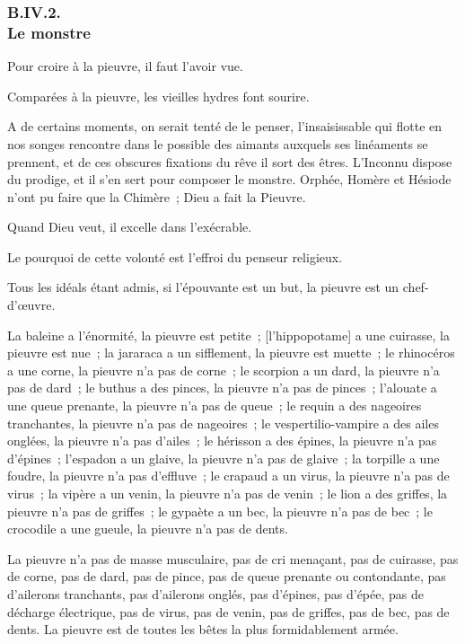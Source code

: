 \documentclass[french,twoside]{book} %
\newcommand\corr[1]{#1}
\begin{document}
 \subsubsection[{B.IV.2. Le monstre}]{B.IV.2. \\
Le monstre}
\noindent Pour croire à la pieuvre, il faut l’avoir vue.\par
Comparées à la pieuvre, les vieilles hydres font sourire.\par
A de certains moments, on serait tenté de le penser, l’insaisissable qui flotte en nos songes rencontre dans le possible des aimants auxquels ses linéaments se prennent, et de ces obscures fixations du rêve il sort des êtres. L’Inconnu dispose du prodige, et il s’en sert pour composer le monstre. Orphée, Homère et Hésiode n’ont pu faire que la Chimère ; Dieu a fait la Pieuvre.\par
Quand Dieu veut, il excelle dans l’exécrable.\par
Le pourquoi de cette volonté est l’effroi du penseur religieux.\par
Tous les idéals étant admis, si l’épouvante est un but, la pieuvre est un chef-d’œuvre.\par
La baleine a l’énormité, la pieuvre est petite ; [{\corr l’hippopotame}] a une cuirasse, la pieuvre est nue ; la jararaca  a un sifflement, la pieuvre est muette ; le rhinocéros a une corne, la pieuvre n’a pas de corne ; le scorpion a un dard, la pieuvre n’a pas de dard ; le buthus a des pinces, la pieuvre n’a pas de pinces ; l’alouate a une queue prenante, la pieuvre n’a pas de queue ; le requin a des nageoires tranchantes, la pieuvre n’a pas de nageoires ; le vespertilio-vampire a des ailes onglées, la pieuvre n’a pas d’ailes ; le hérisson a des épines, la pieuvre n’a pas d’épines ; l’espadon a un glaive, la pieuvre n’a pas de glaive ; la torpille a une foudre, la pieuvre n’a pas d’effluve ; le crapaud a un virus, la pieuvre n’a pas de virus ; la vipère a un venin, la pieuvre n’a pas de venin ; le lion a des griffes, la pieuvre n’a pas de griffes ; le gypaète a un bec, la pieuvre n’a pas de bec ; le crocodile a une gueule, la pieuvre n’a pas de dents.\par
La pieuvre n’a pas de masse musculaire, pas de cri menaçant, pas de cuirasse, pas de corne, pas de dard, pas de pince, pas de queue prenante ou contondante, pas d’ailerons tranchants, pas d’ailerons onglés, pas d’épines, pas d’épée, pas de décharge électrique, pas de virus, pas de venin, pas de griffes, pas de bec, pas de dents. La pieuvre est de toutes les bêtes la plus formidablement armée.\par
\end{document}
